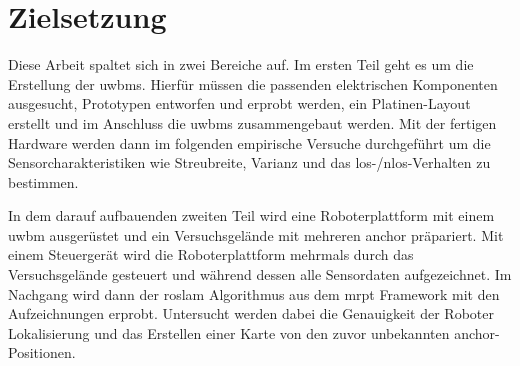 \section{Zielsetzung}

Diese Arbeit spaltet sich in zwei Bereiche auf. Im ersten Teil geht es um die Erstellung der \Glspl{uwbm}. Hierfür müssen die passenden elektrischen Komponenten ausgesucht, Prototypen entworfen und erprobt werden, ein Platinen-Layout erstellt und im Anschluss die \Glspl{uwbm} zusammengebaut werden. Mit der fertigen Hardware werden dann im folgenden empirische Versuche durchgeführt um die Sensorcharakteristiken wie Streubreite, Varianz und das \Gls{los}-/\Gls{nlos}-Verhalten zu bestimmen.

In dem darauf aufbauenden zweiten Teil wird eine Roboterplattform mit einem \Gls{uwbm} ausgerüstet und ein Versuchsgelände mit mehreren \Gls{anchor} präpariert. Mit einem Steuergerät wird die Roboterplattform mehrmals durch das Versuchsgelände gesteuert und während dessen alle Sensordaten aufgezeichnet.
Im Nachgang wird dann der \Gls{roslam} Algorithmus aus dem \Gls{mrpt} Framework mit den Aufzeichnungen erprobt. Untersucht werden dabei die Genauigkeit der Roboter Lokalisierung und das Erstellen einer Karte von den zuvor unbekannten \Gls{anchor}-Positionen.


%
%


%
%


%
%
